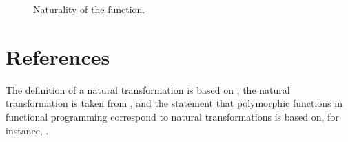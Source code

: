 \begin{example}
  \begin{figure}[htb]
    \begin{center}
    \end{center}
    \caption{Naturality of the  function.}
    \label{fig:naturality-last-haskell}
  \end{figure}

\end{example}

\section{References}
\label{sec:naturals-references}

The definition of a natural transformation is based on
\parencites[16]{maclane-1998}[435--436]{poigne-1992}, the \nat{\eta}
natural transformation is taken from \parencite[11]{marquis-2013}, and
the statement that polymorphic functions in functional programming
correspond to natural transformations is based on, for instance,
\parencites[34]{bird-demoor-1997}[78]{elkins-2009}[435,
  436]{poigne-1992}[48,
  49]{rydeheard-1986}[113]{rydeheard-1988}[350]{wadler-1989}.

\clearemptydoublepage
